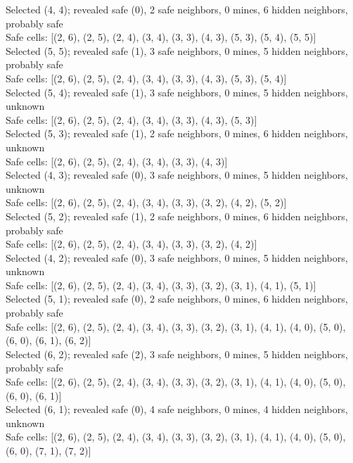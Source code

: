 \documentclass[11pt]{article} %
\begin{document}
Selected (4, 4); revealed safe (0), 2 safe neighbors, 0 mines, 6 hidden neighbors, probably safe\\
Safe cells: [(2, 6), (2, 5), (2, 4), (3, 4), (3, 3), (4, 3), (5, 3), (5, 4), (5, 5)]\\
Selected (5, 5); revealed safe (1), 3 safe neighbors, 0 mines, 5 hidden neighbors, probably safe\\
Safe cells: [(2, 6), (2, 5), (2, 4), (3, 4), (3, 3), (4, 3), (5, 3), (5, 4)]\\
Selected (5, 4); revealed safe (1), 3 safe neighbors, 0 mines, 5 hidden neighbors, unknown\\
Safe cells: [(2, 6), (2, 5), (2, 4), (3, 4), (3, 3), (4, 3), (5, 3)]\\
Selected (5, 3); revealed safe (1), 2 safe neighbors, 0 mines, 6 hidden neighbors, unknown\\
Safe cells: [(2, 6), (2, 5), (2, 4), (3, 4), (3, 3), (4, 3)]\\
Selected (4, 3); revealed safe (0), 3 safe neighbors, 0 mines, 5 hidden neighbors, unknown\\
Safe cells: [(2, 6), (2, 5), (2, 4), (3, 4), (3, 3), (3, 2), (4, 2), (5, 2)]\\
Selected (5, 2); revealed safe (1), 2 safe neighbors, 0 mines, 6 hidden neighbors, probably safe\\
Safe cells: [(2, 6), (2, 5), (2, 4), (3, 4), (3, 3), (3, 2), (4, 2)]\\
Selected (4, 2); revealed safe (0), 3 safe neighbors, 0 mines, 5 hidden neighbors, unknown\\
Safe cells: [(2, 6), (2, 5), (2, 4), (3, 4), (3, 3), (3, 2), (3, 1), (4, 1), (5, 1)]\\
Selected (5, 1); revealed safe (0), 2 safe neighbors, 0 mines, 6 hidden neighbors, probably safe\\
Safe cells: [(2, 6), (2, 5), (2, 4), (3, 4), (3, 3), (3, 2), (3, 1), (4, 1), (4, 0), (5, 0), (6, 0), (6, 1), (6, 2)]\\
Selected (6, 2); revealed safe (2), 3 safe neighbors, 0 mines, 5 hidden neighbors, probably safe\\
Safe cells: [(2, 6), (2, 5), (2, 4), (3, 4), (3, 3), (3, 2), (3, 1), (4, 1), (4, 0), (5, 0), (6, 0), (6, 1)]\\
Selected (6, 1); revealed safe (0), 4 safe neighbors, 0 mines, 4 hidden neighbors, unknown\\
Safe cells: [(2, 6), (2, 5), (2, 4), (3, 4), (3, 3), (3, 2), (3, 1), (4, 1), (4, 0), (5, 0), (6, 0), (7, 1), (7, 2)]\\
\end{document}
